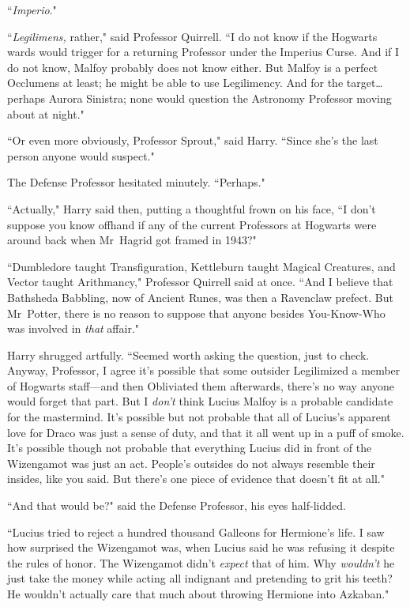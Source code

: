``\emph{Imperio}."

``\emph{Legilimens,} rather," said Professor Quirrell. ``I do not know if the Hogwarts wards would trigger for a returning Professor under the Imperius Curse. And if I do not know, Malfoy probably does not know either. But Malfoy is a perfect Occlumens at least; he might be able to use Legilimency. And for the target{\ldots} perhaps Aurora Sinistra; none would question the Astronomy Professor moving about at night."

``Or even more obviously, Professor Sprout," said Harry. ``Since she's the last person anyone would suspect."

The Defense Professor hesitated minutely. ``Perhaps."

``Actually," Harry said then, putting a thoughtful frown on his face, ``I don't suppose you know offhand if any of the current Professors at Hogwarts were around back when Mr~Hagrid got framed in 1943?"

``Dumbledore taught Transfiguration, Kettleburn taught Magical Creatures, and Vector taught Arithmancy," Professor Quirrell said at once. ``And I believe that Bathsheda Babbling, now of Ancient Runes, was then a Ravenclaw prefect. But Mr~Potter, there is no reason to suppose that anyone besides You-Know-Who was involved in \emph{that} affair."

Harry shrugged artfully. ``Seemed worth asking the question, just to check. Anyway, Professor, I agree it's possible that some outsider Legilimized a member of Hogwarts staff—and then Obliviated them afterwards, there's no way anyone would forget that part. But I \emph{don't} think Lucius Malfoy is a probable candidate for the mastermind. It's possible but not probable that all of Lucius's apparent love for Draco was just a sense of duty, and that it all went up in a puff of smoke. It's possible though not probable that everything Lucius did in front of the Wizengamot was just an act. People's outsides do not always resemble their insides, like you said. But there's one piece of evidence that doesn't fit at all."

``And that would be?" said the Defense Professor, his eyes half-lidded.

``Lucius tried to reject a hundred thousand Galleons for Hermione's life. I saw how surprised the Wizengamot was, when Lucius said he was refusing it despite the rules of honor. The Wizengamot didn't \emph{expect} that of him. Why \emph{wouldn't} he just take the money while acting all indignant and pretending to grit his teeth? He wouldn't actually care that much about throwing Hermione into Azkaban."

